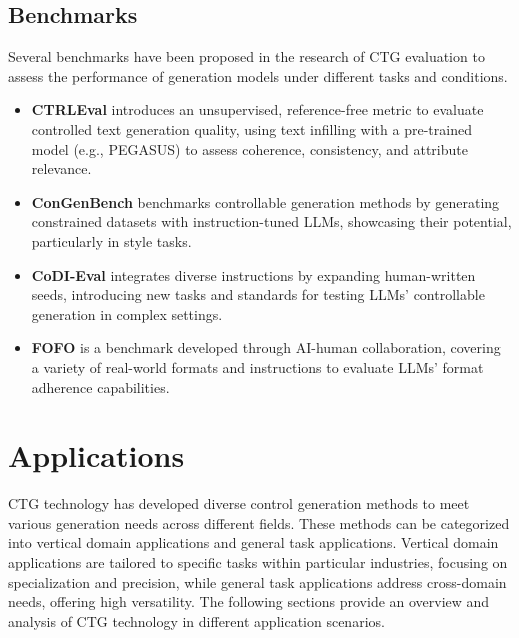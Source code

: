 \documentclass[acmsmall, screen]{acmart}
\begin{document}
\subsection{Benchmarks}

Several benchmarks have been proposed in the research of CTG evaluation to assess the performance of generation models under different tasks and conditions.

\begin{itemize}
    \item \textbf{CTRLEval} \cite{ke_acl22_CTRLEval} introduces an unsupervised, reference-free metric to evaluate controlled text generation quality, using text infilling with a pre-trained model (e.g., PEGASUS) to assess coherence, consistency, and attribute relevance.

    \item \textbf{ConGenBench} \cite{ashok_arxiv24_ConGenBench} benchmarks controllable generation methods by generating constrained datasets with instruction-tuned LLMs, showcasing their potential, particularly in style tasks.

    \item \textbf{CoDI-Eval} \cite{chen_AAAI24_CoDIEval} integrates diverse instructions by expanding human-written seeds, introducing new tasks and standards for testing LLMs' controllable generation in complex settings.

    \item \textbf{FOFO} \cite{xia_arxiv24_fofo} is a benchmark developed through AI-human collaboration, covering a variety of real-world formats and instructions to evaluate LLMs' format adherence capabilities.
\end{itemize}


\section{Applications}
\label{sec:ctg_app}

CTG technology has developed diverse control generation methods to meet various generation needs across different fields. These methods can be categorized into vertical domain applications and general task applications. Vertical domain applications are tailored to specific tasks within particular industries, focusing on specialization and precision, while general task applications address cross-domain needs, offering high versatility. The following sections provide an overview and analysis of CTG technology in different application scenarios.
\end{document}
